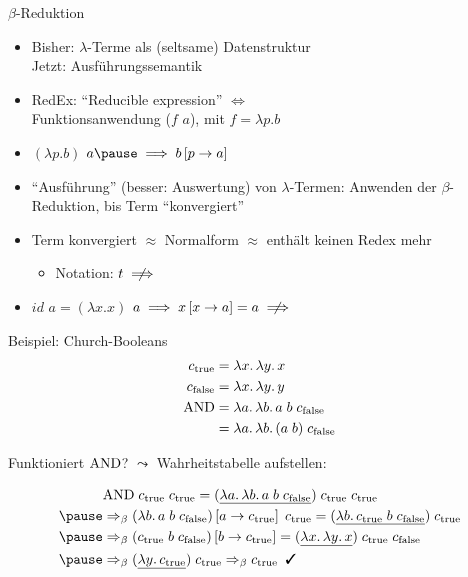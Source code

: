 \documentclass{beamer}
\begin{document}
\begin{frame}{$\beta$-Reduktion}
	\begin{itemize}
		\item Bisher: $\lambda$-Terme als (seltsame) Datenstruktur\\
		      Jetzt: Ausführungssemantik
		\pause
		\item RedEx: \enquote{Reducible expression} $\Leftrightarrow$\\
		      Funktionsanwendung ($f$ $a$), mit $f = \lambda{}p.b$
	      \item $(\lambda{}p.b)$ $a\pause \implies b\left[p \to a\right]$
		\pause
		\item \enquote{Ausführung} (besser: Auswertung) von $\lambda$-Termen: Anwenden der $\beta$-Reduktion, bis Term \enquote{konvergiert}
		\item Term konvergiert $\approx$ Normalform $\approx$ enthält keinen Redex mehr
		\begin{itemize}
			\item Notation: $t \centernot\implies$
		\end{itemize}
		\pause
		\item $id$ $a = (\lambda{}x.x)$ $a \implies x\left[x \to a\right] = a \centernot\implies$
	\end{itemize}
\end{frame}

\begin{frame}{Beispiel: Church-Booleans}
  \begin{eqnarray*}
    c_\text{true} &= \lambda x.\, \lambda y.\, x \\
    c_\text{false} &= \lambda x.\, \lambda y.\, y \\
    \text{AND} &= \lambda a.\, \lambda b.\, a\;b\;c_\text{false} \\
          &= \lambda a.\, \lambda b.\, (a\;b)\;c_\text{false} \\
  \end{eqnarray*}

  Funktioniert $\text{AND}$? $\leadsto$ Wahrheitstabelle aufstellen:

  \begin{eqnarray*}
    &\app{\app{\cand}{\ctrue}}{\ctrue} = \app{\app{(\uline{\lam{a}{\lam{b}{\app{\app{a}{b}}{\cfalse}}}})}{\ctrue}}{\ctrue} \\
    \pause
    &\Rightarrow_\beta \app{(\lam{b}{\app{\app{a}{b}}{\cfalse}})\left[ a \to \ctrue \right]}{\ctrue} = \app{(\uline{\lam{b}{\app{\app{\ctrue}{b}}{\cfalse}}})}{\ctrue} \\
    \pause
    &\Rightarrow_\beta (\app{\app{\ctrue}{b}}{\cfalse}) \left[ b \to \ctrue \right] = \app{\app{(\uline{\lam{x}{\lam{y}{x}}})}{\ctrue}}{\cfalse} \\
    \pause
    &\Rightarrow_\beta \app{(\uline{\lam{y}{\ctrue}})}{\ctrue} \Rightarrow_\beta \ctrue \;\; \text{\true}
  \end{eqnarray*}
\end{frame}
\end{document}
